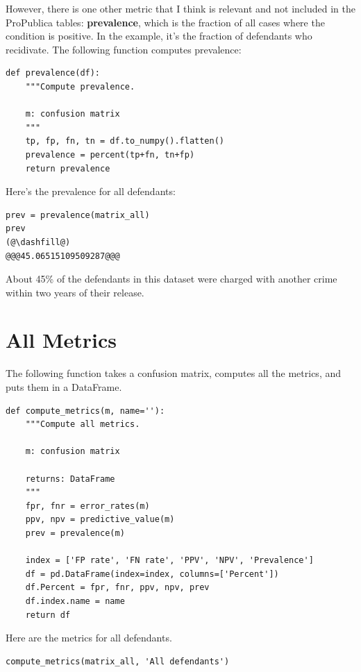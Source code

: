 However, there is one other metric that I think is relevant and not
included in the ProPublica tables: \textbf{prevalence}, which is the
fraction of all cases where the condition is positive. In the example,
it's the fraction of defendants who recidivate. The following function
computes prevalence:

\begin{lstlisting}[]
def prevalence(df):
    """Compute prevalence.
    
    m: confusion matrix
    """
    tp, fp, fn, tn = df.to_numpy().flatten()
    prevalence = percent(tp+fn, tn+fp)
    return prevalence
\end{lstlisting}

Here's the prevalence for all defendants:

\begin{lstlisting}[]
prev = prevalence(matrix_all)
prev
(@\dashfill@)
@@@45.06515109509287@@@
\end{lstlisting}

About 45\% of the defendants in this dataset were charged with another
crime within two years of their release.

\hypertarget{all-metrics}{%
\section{All Metrics}\label{all-metrics}}

The following function takes a confusion matrix, computes all the
metrics, and puts them in a DataFrame.

\begin{lstlisting}[]
def compute_metrics(m, name=''):
    """Compute all metrics.
    
    m: confusion matrix
    
    returns: DataFrame
    """
    fpr, fnr = error_rates(m)
    ppv, npv = predictive_value(m)
    prev = prevalence(m)
    
    index = ['FP rate', 'FN rate', 'PPV', 'NPV', 'Prevalence']
    df = pd.DataFrame(index=index, columns=['Percent'])
    df.Percent = fpr, fnr, ppv, npv, prev
    df.index.name = name
    return df
\end{lstlisting}

Here are the metrics for all defendants.

\begin{lstlisting}[]
compute_metrics(matrix_all, 'All defendants')
\end{lstlisting}

